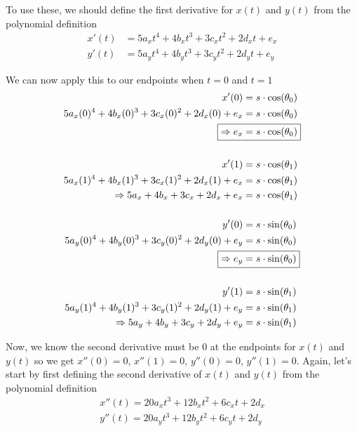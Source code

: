 \documentclass[12pt, letterpaper]{article}
\begin{document}
To use these, we should define the first derivative for \(x(t)\) and \(y(t)\) from the polynomial definition
\begin{align}
x'(t) &= 5a_xt^4 + 4b_xt^3 + 3c_xt^2 + 2d_xt + e_x \nonumber \\
y'(t) &= 5a_yt^4 + 4b_yt^3 + 3c_yt^2 + 2d_yt + e_y \nonumber
\end{align}

We can now apply this to our endpoints when \(t = 0\) and \(t = 1\) 
\begin{align}
x'(0) &= s \cdot \cos(\theta_0) \nonumber \\
5a_x(0)^4 + 4b_x(0)^3 + 3c_x(0)^2 + 2d_x(0) + e_x &= s \cdot \cos(\theta_0) \nonumber \\
\Aboxed{\Rightarrow e_x &= s \cdot \cos(\theta_0)} \\
\nonumber \\
x'(1) &= s \cdot \cos(\theta_1) \nonumber \\
5a_x(1)^4 + 4b_x(1)^3 + 3c_x(1)^2 + 2d_x(1) + e_x &= s \cdot \cos(\theta_1) \nonumber \\
\Rightarrow 5a_x + 4b_x + 3c_x + 2d_x + e_x &= s \cdot \cos(\theta_1) \\
\nonumber \\
y'(0) &= s \cdot \sin(\theta_0) \nonumber \\
5a_y(0)^4 + 4b_y(0)^3 + 3c_y(0)^2 + 2d_y(0) + e_y &= s \cdot \sin(\theta_0) \nonumber \\
\Aboxed{\Rightarrow e_y &= s \cdot \sin(\theta_0)} \\
\nonumber \\
y'(1) &= s \cdot \sin(\theta_1) \nonumber \\
5a_y(1)^4 + 4b_y(1)^3 + 3c_y(1)^2 + 2d_y(1) + e_y &= s \cdot \sin(\theta_1) \nonumber \\
\Rightarrow 5a_y + 4b_y + 3c_y + 2d_y + e_y &= s \cdot \sin(\theta_1) 
\end{align}

Now, we know the second derivative must be \(0\) at the endpoints for \(x(t)\) and \(y(t)\) so we get \(x''(0) = 0\), \(x''(1) = 0\), \(y''(0) = 0\), \(y''(1) = 0\). Again, let's start by first defining the second derivative of \(x(t)\) and \(y(t)\) from the polynomial definition
\begin{align}
x''(t) = 20a_xt^3 + 12b_xt^2 + 6c_xt + 2d_x \nonumber \\
y''(t) = 20a_yt^3 + 12b_yt^2 + 6c_yt + 2d_y \nonumber
\end{align}
\end{document}

